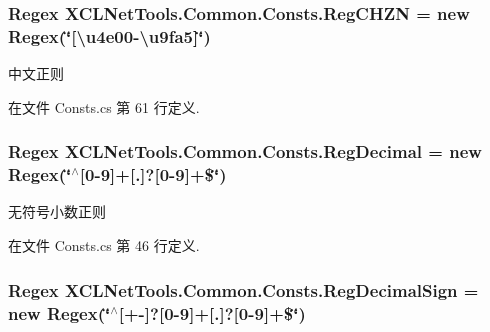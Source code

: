\subsubsection[{\texorpdfstring{Reg\+C\+H\+ZN}{RegCHZN}}]{\setlength{\rightskip}{0pt plus 5cm}Regex X\+C\+L\+Net\+Tools.\+Common.\+Consts.\+Reg\+C\+H\+ZN = new Regex(\char`\"{}\mbox{[}\textbackslash{}u4e00-\/\textbackslash{}u9fa5\mbox{]}\char`\"{})\hspace{0.3cm}{\ttfamily [static]}}\hypertarget{class_x_c_l_net_tools_1_1_common_1_1_consts_aeb4f95ff285059a276d3191ada22bce5}{}\label{class_x_c_l_net_tools_1_1_common_1_1_consts_aeb4f95ff285059a276d3191ada22bce5}


中文正则 



在文件 Consts.\+cs 第 61 行定义.

\subsubsection[{\texorpdfstring{Reg\+Decimal}{RegDecimal}}]{\setlength{\rightskip}{0pt plus 5cm}Regex X\+C\+L\+Net\+Tools.\+Common.\+Consts.\+Reg\+Decimal = new Regex(\char`\"{}$^\wedge$\mbox{[}0-\/9\mbox{]}+\mbox{[}.\mbox{]}?\mbox{[}0-\/9\mbox{]}+\$\char`\"{})\hspace{0.3cm}{\ttfamily [static]}}\hypertarget{class_x_c_l_net_tools_1_1_common_1_1_consts_ae458af39aa12dc5dc1ec960a8c885aa5}{}\label{class_x_c_l_net_tools_1_1_common_1_1_consts_ae458af39aa12dc5dc1ec960a8c885aa5}


无符号小数正则 



在文件 Consts.\+cs 第 46 行定义.

\subsubsection[{\texorpdfstring{Reg\+Decimal\+Sign}{RegDecimalSign}}]{\setlength{\rightskip}{0pt plus 5cm}Regex X\+C\+L\+Net\+Tools.\+Common.\+Consts.\+Reg\+Decimal\+Sign = new Regex(\char`\"{}$^\wedge$\mbox{[}+-\/\mbox{]}?\mbox{[}0-\/9\mbox{]}+\mbox{[}.\mbox{]}?\mbox{[}0-\/9\mbox{]}+\$\char`\"{})\hspace{0.3cm}{\ttfamily [static]}}\hypertarget{class_x_c_l_net_tools_1_1_common_1_1_consts_a06acd9076fbb4b584a984142589eca11}{}\label{class_x_c_l_net_tools_1_1_common_1_1_consts_a06acd9076fbb4b584a984142589eca11}


